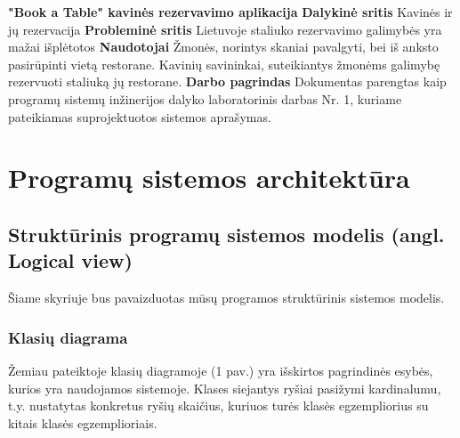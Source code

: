 \documentclass{VUMIFPSkursinis}
\begin{document}
\noindent
{\bfseries "Book a Table" kavinės rezervavimo aplikacija}
\newline
\newline
{\bfseries Dalykinė sritis}
\newline
Kavinės ir jų rezervacija
\newline
\newline
{\bfseries Probleminė sritis}
\newline
 Lietuvoje staliuko rezervavimo galimybės yra mažai išplėtotos
\newline
\newline
{\bfseries Naudotojai}
\newline
Žmonės, norintys skaniai pavalgyti, bei iš anksto pasirūpinti vietą restorane.
\newline
Kavinių savininkai, suteikiantys žmonėms galimybę rezervuoti staliuką jų restorane.
\newline
\newline
{\bfseries Darbo pagrindas}
\newline
Dokumentas parengtas kaip programų sistemų inžinerijos dalyko laboratorinis darbas Nr. 1, kuriame pateikiamas suprojektuotos sistemos aprašymas.
\newline
\newline

\section{Programų sistemos architektūra}

\subsection{Struktūrinis programų sistemos modelis (angl. Logical view)}
Šiame skyriuje bus pavaizduotas mūsų programos struktūrinis sistemos modelis.
\subsubsection{Klasių diagrama}



Žemiau pateiktoje klasių diagramoje (1 pav.) yra išskirtos pagrindinės esybės, kurios yra naudojamos sistemoje. Klases siejantys ryšiai pasižymi kardinalumu, t.y. nustatytas konkretus ryšių skaičius, kuriuos turės klasės egzempliorius su kitais klasės egzemplioriais.
\newline
\newline
\end{document}
